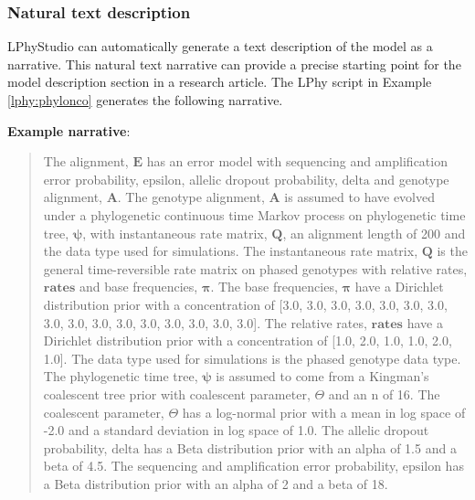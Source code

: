 \documentclass[10pt,letterpaper,table]{article}
\theoremstyle{definition}
\begin{document}
\subsubsection*{Natural text description}
\noindent LPhyStudio can automatically generate a text description of the model as a narrative. 
This natural text narrative can provide a precise starting point for the model description section in a research article.
The LPhy script in Example \ref{lphy:phylonco} generates the following narrative. 

\textbf{Example narrative}: 
\begin{quote} 
The alignment, $\boldsymbol{E}$ has an error model \cite{kozlov2022cellphy} with  sequencing and amplification error probability, $\textrm{epsilon}$,  allelic dropout probability, $\textrm{delta}$ and  genotype alignment, $\boldsymbol{A}$.
The genotype alignment, $\boldsymbol{A}$ is assumed to have evolved under a phylogenetic continuous time Markov process \cite{felsenstein1981} on  phylogenetic time tree, $\boldsymbol{\psi}$, with  instantaneous rate matrix, $\boldsymbol{Q}$, an alignment length of 200 and the data type used for simulations.
The instantaneous rate matrix, $\boldsymbol{Q}$ is the general time-reversible rate matrix on phased genotypes \cite{kozlov2022cellphy} with relative rates, $\boldsymbol{\textbf{rates}}$ and base frequencies, $\boldsymbol{\pi}$.
The base frequencies, $\boldsymbol{\pi}$ have a Dirichlet distribution prior with a concentration of [3.0, 3.0, 3.0, 3.0, 3.0, 3.0, 3.0, 3.0, 3.0, 3.0, 3.0, 3.0, 3.0, 3.0, 3.0, 3.0].
The relative rates, $\boldsymbol{\textbf{rates}}$ have a Dirichlet distribution prior with a concentration of [1.0, 2.0, 1.0, 1.0, 2.0, 1.0].
The data type used for simulations is the phased genotype data type.
The phylogenetic time tree, $\boldsymbol{\psi}$ is assumed to come from a Kingman's coalescent tree prior \cite{Rodrigo1999SerialCoalescent} with  coalescent parameter, $\Theta$ and an n of 16.
The coalescent parameter, $\Theta$ has a log-normal prior with a mean in log space of -2.0 and a standard deviation in log space of 1.0.
The allelic dropout probability, $\textrm{delta}$ has a Beta distribution prior with an alpha of 1.5 and a beta of 4.5.
The sequencing and amplification error probability, $\textrm{epsilon}$ has a Beta distribution prior with an alpha of 2 and a beta of 18.
\end{quote}
\end{document}
